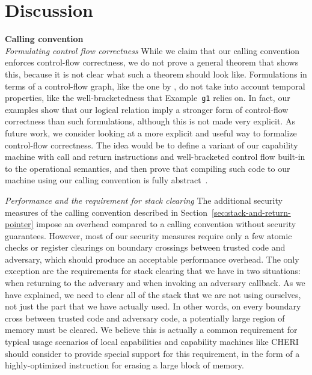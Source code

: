 \documentclass[acmsmall,review]{acmart}\settopmatter{printfolios=true}
\begin{document}
\section{Discussion}
\label{sec:discussion}
\noindent\textbf{Calling convention}\\
\emph{Formulating control flow correctness} While we claim that our calling
convention enforces control-flow correctness, we do not prove a general theorem
that shows this, because it is not clear what such a theorem should look like.
Formulations in terms of a control-flow graph, like the one by
\citet{abadi_control-flow_2005}, do not take into account temporal properties,
like the well-bracketedness that Example~\texttt{\footnotesize{g1}} relies on.
In fact, our examples show that our logical relation imply a stronger form of
control-flow correctness than such formulations, although this is not made very
explicit. As future work, we consider looking at a more explicit and useful way
to formalize control-flow correctness. The idea would be to define a variant
of our capability machine with call and return instructions and
well-bracketed control flow built-in to the operational semantics, and then
prove that compiling such code to our machine using our calling convention is
fully abstract~\citep{abadi_protection_1998}.

\emph{Performance and the requirement for stack clearing} The additional
security measures of the calling convention described in
Section~\ref{sec:stack-and-return-pointer} impose an overhead compared to a
calling convention without security guarantees. However, most of our security measures
require only a few atomic checks or register clearings on boundary crossings
between trusted code and adversary, which should produce an acceptable
performance overhead. The only exception are the requirements for stack clearing
that we have in two situations: when returning to the adversary and when
invoking an adversary callback. As we have explained, we need to clear all of
the stack that we are not using ourselves, not just the part that we have
actually used. In other words, on every boundary cross between trusted code and
adversary code, a potentially large region of memory must be cleared. We believe
this is actually a common requirement for typical usage scenarios of local
capabilities and capability machines like CHERI should consider to provide
special support for this requirement, in the form of a highly-optimized
instruction for erasing a large block of memory.
\end{document}
